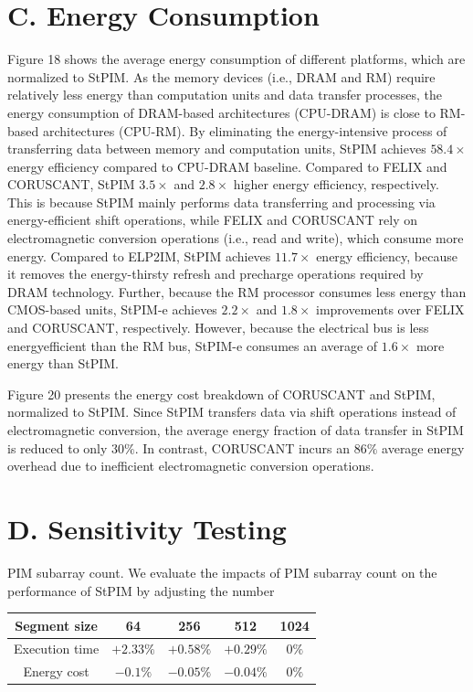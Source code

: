 \documentclass[10pt]{article}
\begin{document}
\section*{C. Energy Consumption}
Figure 18 shows the average energy consumption of different platforms, which are normalized to StPIM. As the memory devices (i.e., DRAM and RM) require relatively less energy than computation units and data transfer processes, the energy consumption of DRAM-based architectures (CPU-DRAM) is close to RM-based architectures (CPU-RM). By eliminating the energy-intensive process of transferring data between memory and computation units, StPIM achieves $58.4 \times$ energy efficiency compared to CPU-DRAM baseline. Compared to FELIX and CORUSCANT, StPIM $3.5 \times$ and $2.8 \times$ higher energy efficiency, respectively. This is because StPIM mainly performs data transferring and processing via energy-efficient shift operations, while FELIX and CORUSCANT rely on electromagnetic conversion operations (i.e., read and write), which consume more energy. Compared to ELP2IM, StPIM achieves $11.7 \times$ energy efficiency, because it removes the energy-thirsty refresh and precharge operations required by DRAM technology. Further, because the RM processor consumes less energy than CMOS-based units, StPIM-e achieves $2.2 \times$ and $1.8 \times$ improvements over FELIX and CORUSCANT, respectively. However, because the electrical bus is less energyefficient than the RM bus, StPIM-e consumes an average of $1.6 \times$ more energy than StPIM.

Figure 20 presents the energy cost breakdown of CORUSCANT and StPIM, normalized to StPIM. Since StPIM transfers data via shift operations instead of electromagnetic conversion, the average energy fraction of data transfer in StPIM is reduced to only $30 \%$. In contrast, CORUSCANT incurs an $86 \%$ average energy overhead due to inefficient electromagnetic conversion operations.

\section*{D. Sensitivity Testing}
PIM subarray count. We evaluate the impacts of PIM subarray count on the performance of StPIM by adjusting the number

\begin{center}
\begin{tabular}{|c|c|c|c|c|}
\hline
Segment size & 64 & 256 & 512 & 1024 \\
\hline
Execution time & $+2.33 \%$ & $+0.58 \%$ & $+0.29 \%$ & $0 \%$ \\
\hline
Energy cost & $-0.1 \%$ & $-0.05 \%$ & $-0.04 \%$ & $0 \%$ \\
\hline
\end{tabular}
\end{center}
\end{document}
